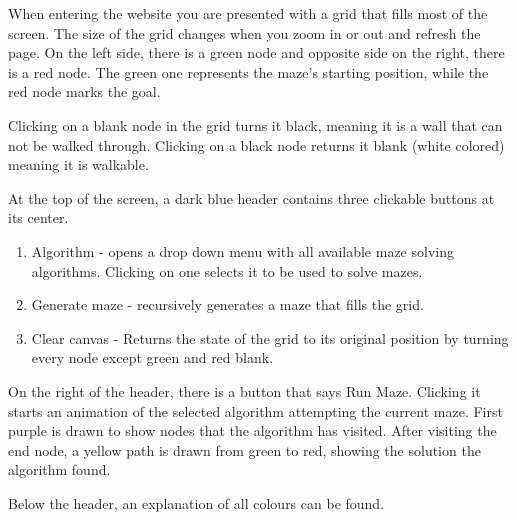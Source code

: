 When entering the website you are presented with a grid that fills most of the screen. The size of the grid changes when you zoom in or out and refresh the page. On the left side, there is a green node and opposite side on the right, there is a red node. The green one represents the maze’s starting position, while the red node marks the goal. 

Clicking on a blank node in the grid turns it black, meaning it is a wall that can not be walked through. Clicking on a black node returns it blank (white colored) meaning it is walkable.

At the top of the screen, a dark blue header contains three clickable buttons at its center. 

\begin{enumerate}
    \item Algorithm - opens a drop down menu with all available maze solving algorithms. Clicking on one selects it to be used to solve mazes.  
    \item Generate maze -  recursively generates a maze that fills the grid.
    \item Clear canvas - Returns the state of the grid to its original position by turning every node except green and red blank. 
\end{enumerate}

On the right of the header, there is a button that says Run Maze. Clicking it starts an animation of the selected algorithm attempting the current maze. First purple is drawn to show nodes that the algorithm has visited.  After visiting the end node, a yellow path is drawn from green to red, showing the solution the algorithm found. 

Below the header, an explanation of all colours can be found.